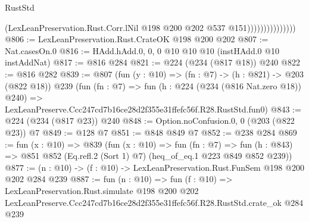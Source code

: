 \begin{lexlean}{RustStd}
\begin{coremodule}
                                (LexLeanPreservation.Rust.Corr.lNil
                                  @198
                                  @200
                                  @202
                                  @537
                                  @151)))))))))))))))
@806 := LexLeanPreservation.Rust.CrateOK @198 @200 @202
@807 := Nat.casesOn.{0}
@816 := HAdd.hAdd.{0, 0, 0} @10 @10 @10 (instHAdd.{0} @10 instAddNat)
@817 := @816 @284
@821 := @224 (@234 (@817 @18)) @240
@822 := @816 @282
@839 := @807
    (fun (y : @10) => (fn : @7) -> (h : @821) -> @203 (@822 @18))
    @239
    (fun (fn : @7) =>
    fun (h : @224 (@234 (@816 Nat.zero @18)) @240) =>
    LexLeanPreserve.Ccc247cd7b16ce28d2f355e31ffefc56f.R28.RustStd.fun0)
@843 := @224 (@234 (@817 @23)) @240
@848 := Option.noConfusion.{0, 0} (@203 (@822 @23)) @7
@849 := @128 @7
@851 := @848 @849 @7
@852 := @238 @284
@869 := fun (x : @10) =>
  @839
    (fun (x : @10) =>
    fun (fn : @7) =>
    fun (h : @843) => @851 @852 (Eq.refl.{2} (Sort 1) @7) (heq_of_eq.{1} @223 @849 @852 @239))
@877 := (n : @10) -> (f : @10) -> LexLeanPreservation.Rust.FunSem @198 @200 @202 @284 @239
@887 := fun (n : @10) =>
  fun (f : @10) =>
  LexLeanPreservation.Rust.simulate
    @198
    @200
    @202
    LexLeanPreserve.Ccc247cd7b16ce28d2f355e31ffefc56f.R28.RustStd.crate_ok
    @284
    @239
\end{coremodule}
\end{lexlean}
